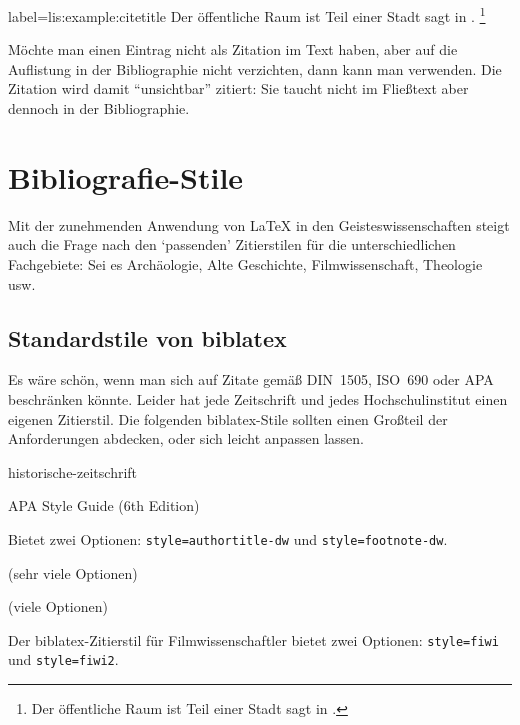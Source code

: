 \begin{lfgwexample}{label={lis:example:citetitle}}
Der öffentliche Raum ist Teil einer Stadt sagt \citeauthor{Osland2016} in .
\footnote{Der öffentliche Raum ist Teil einer Stadt sagt \citeauthor{Osland2016} in .}
\end{lfgwexample}


Möchte man einen Eintrag nicht als Zitation im Text haben, 
aber auf die Auflistung in der Bibliographie nicht verzichten,
dann kann man  verwenden.
Die Zitation wird damit \enquote{unsichtbar} zitiert:
Sie taucht nicht im Fließtext aber dennoch in der Bibliographie.




\section{Bibliografie-Stile}\label{sec:bibliografiestile}
Mit der zunehmenden Anwendung von \LaTeX{} in den Geisteswissenschaften steigt auch die Frage nach den \enquote*{passenden} Zitierstilen für die unterschiedlichen Fachgebiete:
Sei es Archäologie, Alte Geschichte, Filmwissenschaft, Theologie usw.
\subsection{Standardstile von biblatex}

Es wäre schön, wenn man sich auf Zitate gemäß DIN~1505, ISO~690 oder APA beschränken könnte.
Leider hat jede Zeitschrift und jedes Hochschulinstitut einen eigenen Zitierstil.
Die folgenden biblatex-Stile sollten einen Großteil der Anforderungen abdecken, oder sich leicht anpassen lassen.

\begin{labeling}{historische-zeitschrift}
  \item[apa] APA Style Guide (6th Edition)
  \item[biblatex-dw] Bietet zwei Optionen: \lstinline/style=authortitle-dw/ und \lstinline/style=footnote-dw/.
  \item[archaeologie] (sehr viele Optionen)
  \item[geschichtsfrkl] (viele Optionen)
  \item[historische-zeitschrift]
  \item[historian]
  \item[arthistory-bonn]
  \item[biblatex-fiwi] Der biblatex-Zitierstil für Filmwissenschaftler bietet zwei Optionen: \lstinline/style=fiwi/ und \lstinline/style=fiwi2/.
\end{labeling}

